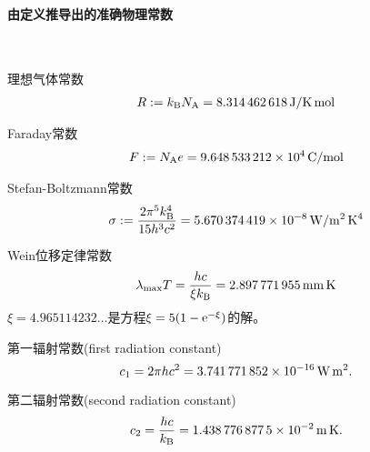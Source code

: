 \paragraph{由定义推导出的准确物理常数}~
\begin{compactitem}
	\item 理想气体常数
		\begin{align}
			R:=k_{\mathrm B}N_{\mathrm A}=\SI{8.314462618}{J/K.mol}
		\end{align} %
	\item Faraday常数
		\begin{align}
			F:=N_{\mathrm A} e=\SI{9.648533212E4}{C/mol}
		\end{align} %
	\item Stefan-Boltzmann常数
		\begin{align}
			\sigma:=\frac{2\pi^5k_{\mathrm B}^4}{15h^3c^2}=\SI{5.670374419E-8}{W/m^2.K^4}
		\end{align} %
	\item Wein位移定律常数
		\begin{align}
			\lambda_\mathrm{max} T=\frac{hc}{\xi k_{\mathrm B}}=\SI{2.897771955}{mm.K}
		\end{align} %
		$\xi=\num{4.965114232}\ldots$是方程$\xi=5(1-\mathop{}\!\mathrm{e}^{-\xi})$的解。
	\item 第一辐射常数(first radiation constant)
		\begin{equation}
			c_1=2\pi hc^2=\SI{3.741771852E-16}{W.m^2}.
		\end{equation} %
	\item 第二辐射常数(second radiation constant)
		\begin{equation}
			c_2=\frac{hc}{k_{\mathrm B}}=\SI{1.4387768775E-2}{m.K}.
		\end{equation} %
\end{compactitem}

